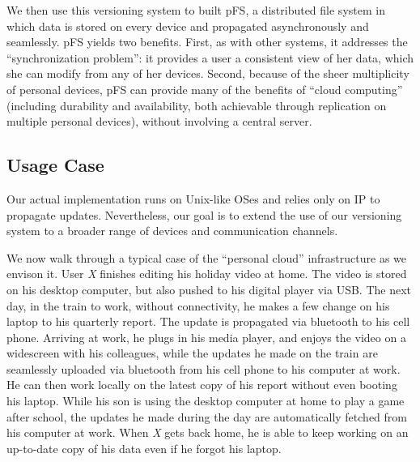 We then use this versioning system to built pFS, a distributed file
system in which data is stored on every device and propagated
asynchronously and seamlessly. pFS yields two benefits. First, as with
other systems, it addresses the ``synchronization problem'': it provides
a user a consistent view of her data, which she can modify from any of her
devices.  Second, because of the sheer multiplicity of personal devices,
pFS can provide many of the benefits of ``cloud computing'' (including
durability and availability, both achievable through replication on
multiple personal devices),  without involving a
central server. 

%

\subsection{Usage Case}

Our actual implementation runs on Unix-like OSes and relies only on IP
to propagate updates. Nevertheless, our goal is to extend the use of
our versioning system to a broader range of devices and communication
channels.
\fi


We now walk through a typical 
case of the ``personal cloud'' infrastructure as we envison it. User
\emph{X} finishes editing his holiday video at home. The video is
stored on his desktop computer, but also pushed to his digital player
via USB. The next day, in the train to work, without connectivity, he
makes a few change on his laptop to his quarterly report. The update
is propagated via bluetooth to his cell phone. Arriving at work, he
plugs in his media player, and enjoys the video on a widescreen with
his colleagues, while the updates he made on the train are seamlessly
uploaded via bluetooth from his cell phone to his computer at work. He
can then work locally on the latest copy of his report without even
booting his laptop. While his son is using the desktop computer at
home to play a game after school, the updates he made during the day
are automatically fetched from his computer at work. When \emph{X}
gets back home, he is able to keep working on an up-to-date copy of
his data even if he forgot his laptop. 

